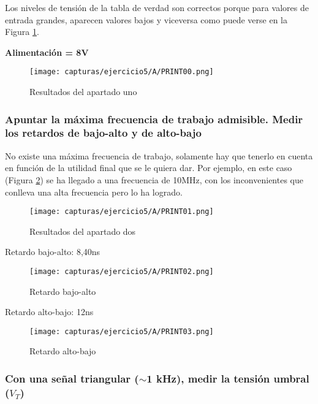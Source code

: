 Los niveles de tensión de la tabla de verdad son correctos porque para valores de entrada grandes, aparecen valores bajos y viceversa como puede verse en la Figura \ref{fig:practica5-a-4}.

\textbf{Alimentación = 8V}
\begin{figure}[H] %
	\centering
	\texttt{[image: capturas/ejercicio5/A/PRINT00.png]} 
	\caption{Resultados del apartado uno}
	\label{fig:practica5-a-4}
\end{figure}


\subsubsection{Apuntar la máxima frecuencia de trabajo admisible. Medir los retardos de bajo-alto y de alto-bajo}

No existe una máxima frecuencia de trabajo, solamente hay que tenerlo en cuenta en función de la utilidad final que se le quiera dar. Por ejemplo, en este caso (Figura \ref{fig:practica5-a-5}) se ha llegado a una frecuencia de 10MHz, con los inconvenientes que conlleva una alta frecuencia pero lo ha logrado.


\begin{figure}[H] %
	\centering
	\texttt{[image: capturas/ejercicio5/A/PRINT01.png]} 
	\caption{Resultados del apartado dos}
	\label{fig:practica5-a-5}
\end{figure}

Retardo bajo-alto: 8,40ns

\begin{figure}[H] %
	\centering
	\texttt{[image: capturas/ejercicio5/A/PRINT02.png]} 
	\caption{Retardo bajo-alto}
	\label{fig:practica5-a-6}
\end{figure}

\newpage

Retardo alto-bajo: 12ns

\begin{figure}[H] %
	\centering
	\texttt{[image: capturas/ejercicio5/A/PRINT03.png]} 
	\caption{Retardo alto-bajo}
	\label{fig:practica5-a-7}
\end{figure}

\subsubsection{Con una señal triangular ($ \sim $1 kHz), medir la tensión umbral ($ V_{T} $)}

